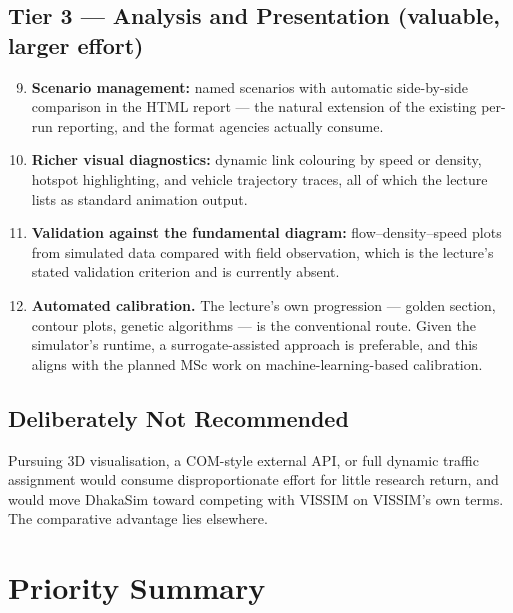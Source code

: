 \documentclass[11pt,a4paper]{article}
\begin{document}
\subsection*{Tier 3 --- Analysis and Presentation (valuable, larger effort)}
\begin{enumerate}\setcounter{enumi}{8}
  \item \textbf{Scenario management:} named scenarios with automatic side-by-side
        comparison in the HTML report --- the natural extension of the existing
        per-run reporting, and the format agencies actually consume.
  \item \textbf{Richer visual diagnostics:} dynamic link colouring by speed or
        density, hotspot highlighting, and vehicle trajectory traces, all of which
        the lecture lists as standard animation output.
  \item \textbf{Validation against the fundamental diagram:} flow--density--speed
        plots from simulated data compared with field observation, which is the
        lecture's stated validation criterion and is currently absent.
  \item \textbf{Automated calibration.} The lecture's own progression --- golden
        section, contour plots, genetic algorithms --- is the conventional route.
        Given the simulator's runtime, a surrogate-assisted approach is preferable,
        and this aligns with the planned MSc work on machine-learning-based
        calibration.
\end{enumerate}

\subsection*{Deliberately Not Recommended}
Pursuing 3D visualisation, a COM-style external API, or full dynamic traffic
assignment would consume disproportionate effort for little research return, and
would move DhakaSim toward competing with VISSIM on VISSIM's own terms. The
comparative advantage lies elsewhere.

\section{Priority Summary}
\end{document}
